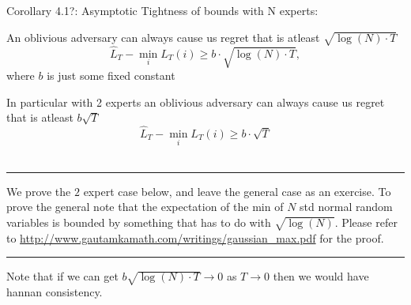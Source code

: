 \documentclass[11pt]{article}
\theoremstyle{quest}
\begin{document}
\begin{tcolorbox}
\begin{center}
Corollary 4.1?: Asymptotic Tightness of bounds with N experts: \end{center}
An oblivious adversary can always cause us regret that is atleast $\sqrt{\log(N) \cdot T}$ 
$$\hat{L}_T-\min_{i}L_T(i)\ge b\cdot \sqrt{\log(N) \cdot T},$$ where $b$ is just some fixed constant

In particular with 2 experts an oblivious adversary can always cause us regret that is atleast $b\sqrt{T}$ 
$$\hat{L}_T-\min_{i}L_T(i)\ge b\cdot \sqrt{T}$$\\
\noindent\rule{\textwidth}{1pt}
We prove the $2$ expert case below, and leave the general case as an exercise. To prove the general note that the expectation of the min of $N$ std normal random variables is bounded by something that has to do with $\sqrt{\log(N)}$. Please refer to \url{http://www.gautamkamath.com/writings/gaussian_max.pdf} for the proof.
\noindent\rule{\textwidth}{1pt}
Note that if we can get  $b\sqrt{\log(N) \cdot T}\rightarrow 0$ as $T\rightarrow 0$ then we would have hannan consistency.  
\end{tcolorbox}
\end{document}
